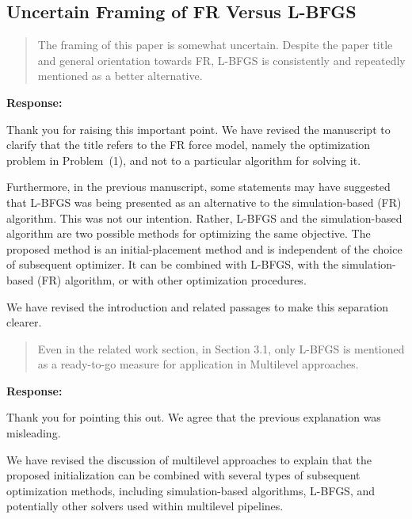 \documentclass[11pt]{article}
\newcommand{\reviewercomment}[1]{%
  \begin{quote}
  \color{blue}
  #1
  \end{quote}
}
\newenvironment{response}{%
  \noindent\textbf{Response:}%
}{%
  \medskip
}
\begin{document}
\subsection{Uncertain Framing of FR Versus L-BFGS}

\reviewercomment{
  The framing of this paper is somewhat uncertain.
  Despite the paper title and general orientation towards FR, L-BFGS is consistently and repeatedly mentioned as a better alternative.
}

\begin{response}
  Thank you for raising this important point.
  We have revised the manuscript to clarify that the title refers to the FR force model, namely the optimization problem in Problem~(1), and not to a particular algorithm for solving it.

  Furthermore, in the previous manuscript, some statements may have suggested that L-BFGS was being presented as an alternative to the simulation-based (FR) algorithm.
  This was not our intention.
  Rather, L-BFGS and the simulation-based algorithm are two possible methods for optimizing the same objective.
  The proposed method is an initial-placement method and is independent of the choice of subsequent optimizer.
  It can be combined with L-BFGS, with the simulation-based (FR) algorithm, or with other optimization procedures.

  We have revised the introduction and related passages to make this separation clearer.
\end{response}

\reviewercomment{
  Even in the related work section, in Section 3.1, only L-BFGS is mentioned as a ready-to-go measure for application in Multilevel approaches.
}
\begin{response}
  Thank you for pointing this out.
  We agree that the previous explanation was misleading.

  We have revised the discussion of multilevel approaches to explain that the proposed initialization can be combined with several types of subsequent optimization methods, including simulation-based algorithms, L-BFGS, and potentially other solvers used within multilevel pipelines.
\end{response}
\end{document}
